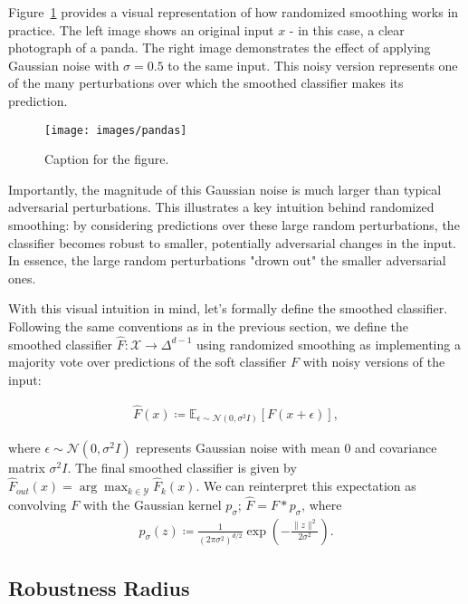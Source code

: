 Figure~\ref{fig:pandas} provides a visual representation of how randomized smoothing works in practice.
The left image shows an original input $x$ - in this case, a clear photograph of a panda.
The right image demonstrates the effect of applying Gaussian noise with $\sigma = 0.5$ to the same input.
This noisy version represents one of the many perturbations over which the smoothed classifier makes its prediction.
\begin{figure}[htbp]
    \centering
    \texttt{[image: images/pandas]}
    \caption{Caption for the figure.}
    \label{fig:pandas}
\end{figure}

Importantly, the magnitude of this Gaussian noise is much larger than typical adversarial perturbations.
This illustrates a key intuition behind randomized smoothing: by considering predictions over these large random perturbations, the classifier becomes robust to smaller, potentially adversarial changes in the input.
In essence, the large random perturbations "drown out" the smaller adversarial ones.

With this visual intuition in mind, let's formally define the smoothed classifier.
Following the same conventions as in the previous section, we define the smoothed classifier $\hat{F}: \mathcal{X} \rightarrow \Delta^{d-1}$ using randomized smoothing as implementing a majority vote over predictions of the soft classifier $F$ with noisy versions of the input:

\begin{align*}
    \hat{F}(x) \coloneqq \mathbb{E}_{\epsilon \sim \mathcal{N}(0, \sigma^2 I)} [F(x + \epsilon)],
\end{align*}

where $\epsilon \sim \mathcal{N}(0, \sigma^2 I)$ represents Gaussian noise with mean $0$ and covariance matrix $\sigma^2 I$.
The final smoothed classifier is given by $\hat{F}_{out}(x) = \arg\max_{k \in \mathcal{Y}} \hat{F}_k(x)$.
We can reinterpret this expectation as convolving $F$ with the Gaussian kernel $p_\sigma$; $\hat{F} = F * p_\sigma$, where
\begin{align*}
    p_\sigma(z) \coloneqq \frac{1}{(2\pi\sigma^2)^{d/2}} \exp\left(-\frac{\|z\|^2}{2\sigma^2}\right).
\end{align*}

\subsection{Robustness Radius}\label{subsec:robustness-radius}

